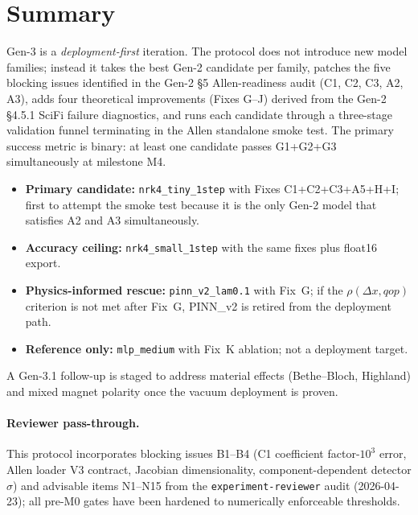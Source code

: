 \documentclass[a4paper,11pt]{article}
\begin{document}
\section{Summary}\label{gen3:sec:summary}

Gen-3 is a \emph{deployment-first} iteration.  The protocol does not
introduce new model families; instead it takes the best Gen-2
candidate per family, patches the five blocking issues identified in
the Gen-2 §5 Allen-readiness audit (C1, C2, C3, A2, A3), adds four
theoretical improvements (Fixes G--J) derived from the Gen-2 §4.5.1
SciFi failure diagnostics, and runs each candidate through a
three-stage validation funnel terminating in the Allen standalone
smoke test.  The primary success metric is binary: at least one
candidate passes G1+G2+G3 simultaneously at milestone M4.

\begin{itemize}
\item \textbf{Primary candidate:}  \texttt{nrk4\_tiny\_1step} with
      Fixes C1+C2+C3+A5+H+I; first to attempt the smoke test
      because it is the only Gen-2 model that satisfies A2 and A3
      simultaneously.
\item \textbf{Accuracy ceiling:}  \texttt{nrk4\_small\_1step} with
      the same fixes plus float16 export.
\item \textbf{Physics-informed rescue:}  \texttt{pinn\_v2\_lam0.1}
      with Fix~G; if the $\rho(\Delta x,qop)$ criterion is not met
      after Fix~G, PINN\_v2 is retired from the deployment path.
\item \textbf{Reference only:}  \texttt{mlp\_medium} with Fix~K
      ablation; not a deployment target.
\end{itemize}

A Gen-3.1 follow-up is staged to address material effects
(Bethe--Bloch, Highland) and mixed magnet polarity once the vacuum
deployment is proven.

\paragraph{Reviewer pass-through.}  This protocol incorporates
blocking issues B1--B4 (C1 coefficient factor-$10^3$ error, Allen
loader V3 contract, Jacobian dimensionality, component-dependent
detector $\sigma$) and advisable items N1--N15 from the
\texttt{experiment-reviewer} audit (2026-04-23); all pre-M0 gates
have been hardened to numerically enforceable thresholds.
\end{document}
